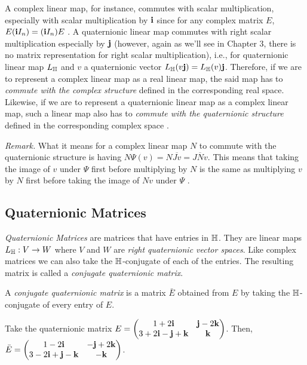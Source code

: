 A complex linear map, for instance, commutes with scalar multiplication, especially with scalar multiplication by $\textbf{i}$ since for any complex matrix $E$, $E(\textbf{i} I_n) = (\textbf{i} I_n)E$ \cite{aslaksen}. A quaternionic linear map commutes with right scalar multiplication especially by $\textbf{j}$ (however, again as we'll see in Chapter 3, there is no matrix representation for right scalar multiplication), i.e., for quaternionic linear map $L_{\operatorname{\mathbb{H}}}$ and $v$ a quaternionic vector $L_{\operatorname{\mathbb{H}}}(v\textbf{j}) = L_{\operatorname{\mathbb{H}}}(v)\textbf{j}$. Therefore, if we are to represent a complex linear map as a real linear map, the said map has to \emph{commute with the complex structure} defined in the corresponding real space. Likewise, if we are to represent a quaternionic linear map as a complex linear map, such a linear map also has to \emph{commute with the quaternionic structure} defined in the corresponding complex space \cite{aslaksen}. 

\textit{Remark.} What it means for a complex linear map $N$ to commute with the quaternionic structure is having $N\Psi(v) = N\overline{Jv} = \overline{JNv}$. This means that taking the image of $v$ under $\Psi$ first before multiplying by $N$ is the same as multiplying $v$ by $N$ first before taking the image of $Nv$ under $\Psi$ \cite{aslaksen}.

\subsection{Quaternionic Matrices} 

\emph{Quaternionic Matrices} are matrices that have entries in $\operatorname{\mathbb{H}}$. They are linear maps $L_{\operatorname{\mathbb{H}}}: V \rightarrow W$ where $V$ and $W$ are \emph{right quaternionic vector spaces}. Like complex matrices we can also take the $\operatorname{\mathbb{H}}$-conjugate of each of the entries. The resulting matrix is called a \emph{conjugate quaternionic matrix}.
\iffalse
\newline
\newline
\begin{definition} \label{conjquatmat}
	A \emph{conjugate quaternionic matrix} is a matrix $\bar{E}$ obtained from $E$ by taking the $\operatorname{\mathbb{H}}$-conjugate of every entry of $E$.
\end{definition}

\begin{ex}
	Take the quaternionic matrix $E = 
	\begin{pmatrix}
		1+2\textbf{i} & \textbf{j}-2\textbf{k} \\
		3+2\textbf{i}-\textbf{j}+\textbf{k} & \textbf{k}
	\end{pmatrix}$.
	Then, $\bar{E} = 
	\begin{pmatrix}
		1-2\textbf{i} & -\textbf{j}+2\textbf{k} \\
		3-2\textbf{i}+\textbf{j}-\textbf{k} & -\textbf{k}
	\end{pmatrix}$.
\end{ex}

